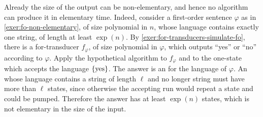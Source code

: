  {
Already the size of the output \nfa can be non-elementary, and hence no algorithm can produce it in elementary time. Indeed, consider a first-order sentence $\varphi$ as in \cref{exer:fo-non-elementary}, of size polynomial in $n$, whose language contains exactly one string, of length at least $\exp(n)$. By \cref{exer:for-transducers-simulate-fo}, there is a for-transducer $f_\varphi$, of size polynomial in $\varphi$, which outputs ``yes'' or ``no'' according to $\varphi$. Apply the hypothetical algorithm to $f_\varphi$ and to the one-state \nfa which accepts the language $\{\text{yes}\}$. The answer is an \nfa for the language of $\varphi$. An \nfa whose language contains a string of length $\ell$ and no longer string must have more than $\ell$ states, since otherwise the accepting run would repeat a state and could be pumped. Therefore the answer has at least $\exp(n)$ states, which is not elementary in the size of the input.
}

